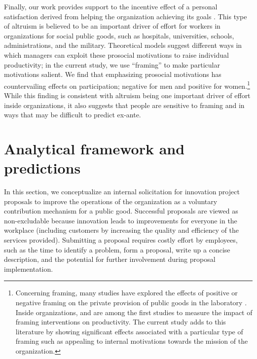 \documentclass[11pt, titlepage]{article}
\begin{document}
Finally, our work provides support to the incentive effect of a personal
satisfaction derived from helping the organization achieving its goals
\citep{akerlof2005identity, besley2005competition, delfgaauw2005dedicated, delfgaauw2008incentives, prendergast2007motivation}.
This type of altruism is believed to be an important driver of effort
for workers in organizations for social public goods, such as hospitals,
universities, schools, administrations, and the military. Theoretical
models suggest different ways in which managers can exploit these
prosocial motivations to raise individual productivity; in the current
study, we use ``framing'' to make particular motivations salient. We
find that emphasizing prosocial motivations has countervailing effects
on participation; negative for men and positive for women.\footnote{Concerning
  framing, many studies have explored the effects of positive or
  negative framing on the private provision of public goods in the
  laboratory \citep{andreoni1995warm}. Inside organizations,
  \citet{hossain2012behavioralist} and \citet{hong2015framing} are among
  the first studies to measure the impact of framing interventions on
  productivity. The current study adds to this literature by showing
  significant effects associated with a particular type of framing such
  as appealing to internal motivations towards the mission of the
  organization.} While this finding is consistent with altruism being
one important driver of effort inside organizations, it also suggests
that people are sensitive to framing and in ways that may be difficult
to predict ex-ante.

\section{Analytical framework and
predictions}\label{analytical-framework-and-predictions}

In this section, we conceptualize an internal solicitation for
innovation project proposals to improve the operations of the
organization as a voluntary contribution mechanism for a public good.
Successful proposals are viewed as non-excludable because innovation
leads to improvements for everyone in the workplace (including customers
by increasing the quality and efficiency of the services provided).
Submitting a proposal requires costly effort by employees, such as the
time to identify a problem, form a proposal, write up a concise
description, and the potential for further involvement during proposal
implementation.
\end{document}
